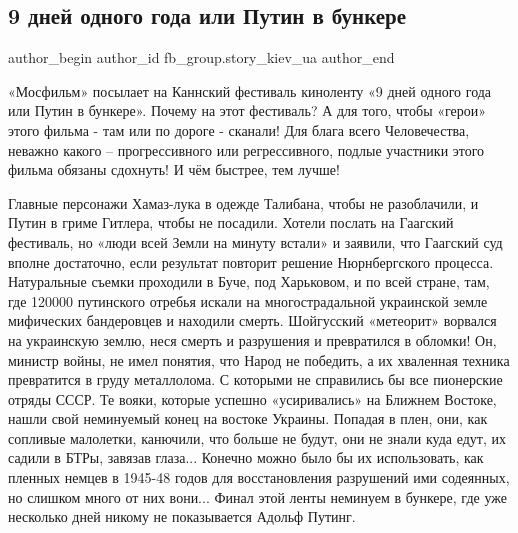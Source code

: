  
 
 
 
 
 
\subsection{9 дней одного года или Путин в бункере}
\label{sec:04_03_2022.fb.fb_group.story_kiev_ua.3.putin_v_bunkere}
 
\ifcmt
 author_begin
   author_id fb_group.story_kiev_ua
 author_end
\fi

«Мосфильм» посылает на Каннский фестиваль киноленту «9 дней одного года или
Путин в бункере». Почему на этот фестиваль? А для того, чтобы «герои» этого
фильма - там или по дороге - сканали! Для блага всего Человечества, неважно
какого – прогрессивного или регрессивного, подлые участники этого фильма
обязаны сдохнуть! И чём быстрее, тем лучше! 


Главные персонажи Хамаз-лука в одежде Талибана, чтобы не разоблачили, и Путин в
гриме Гитлера, чтобы не посадили. Хотели послать на Гаагский фестиваль, но
«люди всей Земли на минуту встали» и заявили, что Гаагский суд вполне
достаточно, если результат повторит решение Нюрнбергского процесса. Натуральные
съемки проходили в Буче, под Харьковом, и по всей стране, там, где 120000
путинского отребья искали на многострадальной украинской земле мифических
бандеровцев и находили смерть. Шойгусский «метеорит» ворвался на украинскую
землю, неся смерть и разрушения и превратился в обломки! Он, министр войны, не
имел понятия, что Народ не победить, а их хваленная техника превратится в груду
металлолома. С которыми не справились бы все пионерские отряды СССР. Те вояки,
которые успешно «усиривались» на Ближнем Востоке, нашли свой неминуемый конец
на востоке Украины. Попадая в плен, они, как сопливые малолетки, канючили, что
больше не будут, они не знали куда едут, их садили в БТРы, завязав глаза...
Конечно можно было бы их использовать, как пленных немцев в 1945-48 годов для
восстановления разрушений ими содеянных, но слишком много от них вони... Финал
этой ленты неминуем в бункере, где уже несколько дней никому не показывается
Адольф Путинг.

